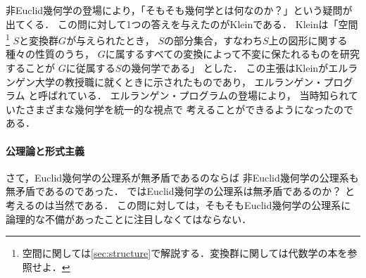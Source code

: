   非Euclid幾何学の登場により，「そもそも幾何学とは何なのか？」という疑問が出てくる．
  この問に対して1つの答えを与えたのがKleinである．
  Kleinは「空間
  \footnote{空間に関しては\ref{sec:structure}で解説する．変換群に関しては代数学の本を参照せよ．}
  $S$と変換群$G$が与えられたとき，
  $S$の部分集合，すなわち$S$上の図形に関する種々の性質のうち，
  $G$に属するすべての変換によって不変に保たれるものを研究することが
  $G$に従属する$S$の幾何学である」
  とした．
  この主張はKleinがエルランゲン大学の教授職に就くときに示されたものであり，
  エルランゲン・プログラム
  と呼ばれている．
  エルランゲン・プログラムの登場により，
  当時知られていたさまざまな幾何学を統一的な視点で
  考えることができるようになったのである．

 \paragraph{公理論と形式主義}
  さて，Euclid幾何学の公理系が無矛盾であるのならば
  非Euclid幾何学の公理系も無矛盾であるのであった．
  ではEuclid幾何学の公理系は無矛盾であるのか？ と考えるのは当然である．
  この問に対しては，そもそもEuclid幾何学の公理系に
  論理的な不備があったことに注目しなくてはならない．
  
